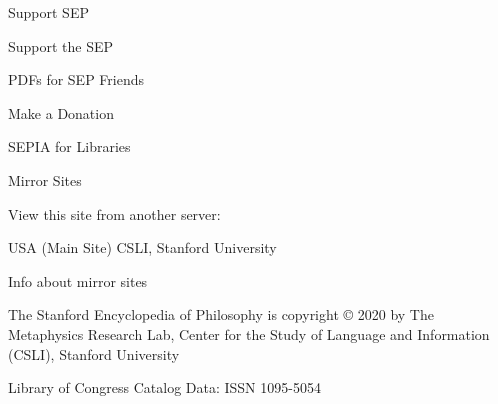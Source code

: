 \documentclass[]{article}
\begin{document}
\begin{menu-block}

 Support SEP

Support the SEP

PDFs for SEP Friends

Make a Donation

SEPIA for Libraries

\end{menu-block}

\hypertarget{mirrors}{}
\hypertarget{mirror-info}{}
 Mirror Sites

View this site from another server:

\begin{btn-group}

{} USA (Main Site) {} {CSLI, Stanford University}

Info about mirror sites

\end{btn-group}

\hypertarget{site-credits}{}
The Stanford Encyclopedia of Philosophy is copyright © 2020 by The
Metaphysics Research Lab, Center for the Study of Language and
Information (CSLI), Stanford University

Library of Congress Catalog Data: ISSN 1095-5054
\end{document}
